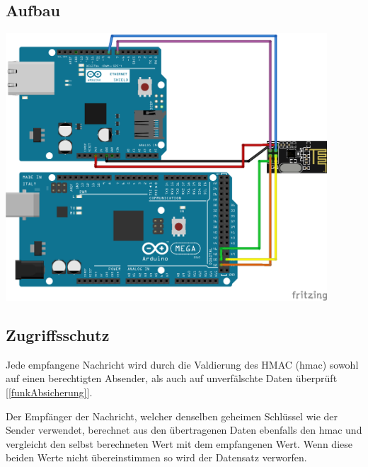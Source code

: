 \documentclass[
  12pt, %
  a4paper, %
  twoside, %
  openany, %
  numbers=noenddot, %
  BCOR=5mm, %
  parskip=half*, %
  thesis, %
]{bfhbook}
\begin{document}
\subsection{Aufbau}
\begin{center}
    \includegraphics[width=12cm, left]{Bilder/MQTT-Gateway-Design_Steckplatine.png}
\end{center}
\subsection{Zugriffsschutz}
Jede empfangene Nachricht wird durch die Valdierung des HMAC (\Gls{hmac}) sowohl auf einen berechtigten Absender, als auch auf unverfälschte Daten überprüft [\ref{funkAbsicherung}].

Der Empfänger der Nachricht, welcher denselben geheimen Schlüssel wie der Sender verwendet, berechnet aus den übertragenen Daten ebenfalls den \Gls{hmac} und vergleicht den selbst berechneten Wert mit dem empfangenen Wert. Wenn diese beiden Werte nicht übereinstimmen so wird der Datensatz verworfen.
\end{document}
